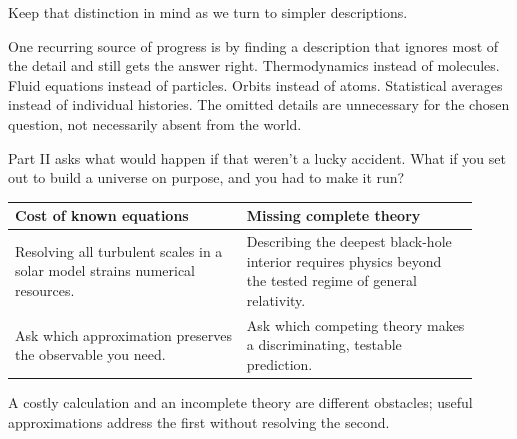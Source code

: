 Keep that distinction in mind as we turn to simpler descriptions.

One recurring source of progress is by finding a description that ignores most of the detail and still gets the answer right. Thermodynamics instead of molecules. Fluid equations instead of particles. Orbits instead of atoms. Statistical averages instead of individual histories. The omitted details are unnecessary for the chosen question, not necessarily absent from the world.

Part II asks what would happen if that weren't a lucky accident. What if you set out to build a universe on purpose, and you had to make it run?

\begin{examplebox}
\begin{tabular}{@{}L{0.46\linewidth}L{0.46\linewidth}@{}}
\textbf{Cost of known equations} & \textbf{Missing complete theory} \\
\hline
Resolving all turbulent scales in a solar model strains numerical resources. & Describing the deepest black-hole interior requires physics beyond the tested regime of general relativity. \\
Ask which approximation preserves the observable you need. & Ask which competing theory makes a discriminating, testable prediction.
\end{tabular}
\end{examplebox}

\begin{keytakeawaybox}
A costly calculation and an incomplete theory are different obstacles; useful approximations address the first without resolving the second.
\end{keytakeawaybox}
